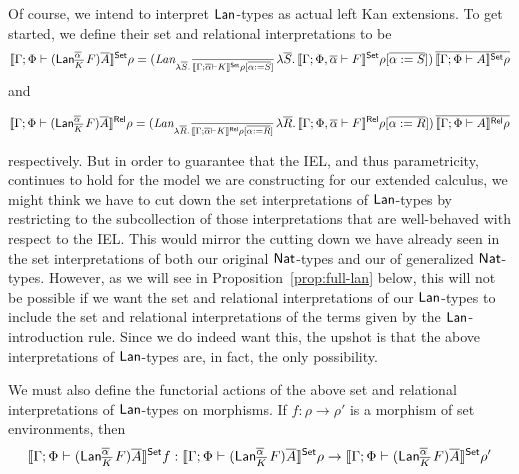 \documentclass{lmcs}
\theoremstyle{plain}\newtheorem{satz}[thm]{Satz}
\begin{document}
Of course, we intend to interpret $\mathsf{Lan}$-types as actual left Kan
extensions. To get started, we define their set and relational
interpretations to be
\[
  \llbracket{\Gamma;\Phi \vdash
    (\mathsf{Lan}^{\overline{\alpha}}_{\overline{K}}\,F)\overline{A}}\rrbracket^{\mathsf{Set}}\rho = (
  \textit{Lan}_{\lambda \overline{S}.\,\overline{\llbracket{\Gamma; \overline{\alpha} \vdash K}\rrbracket^{\mathsf{Set}}
      \rho[\overline{\alpha := S}]}}\, \lambda \overline{S}.\,\llbracket{\Gamma; \Phi, \overline{\alpha}
    \vdash F}\rrbracket^{\mathsf{Set}} \rho[\overline{\alpha := S}])\, \overline{\llbracket{\Gamma; \Phi
      \vdash A}\rrbracket^{\mathsf{Set}}\rho}
\]
and 

\[
  \llbracket{\Gamma;\Phi \vdash
    (\mathsf{Lan}^{\overline{\alpha}}_{\overline{K}}\,F)\overline{A}}\rrbracket^{\mathsf{Rel}}\rho = (
  \textit{Lan}_{\lambda \overline{R}.\,\overline{\llbracket{\Gamma; \overline{\alpha} \vdash
        K}\rrbracket^{\mathsf{Rel}}\rho[\overline{\alpha := R}]}}\, \lambda \overline{R}.\,\llbracket{\Gamma;
    \Phi, \overline{\alpha} \vdash F}\rrbracket^{\mathsf{Rel}}\rho[\overline{\alpha := R}])\,
  \overline{\llbracket{\Gamma; \Phi \vdash A}\rrbracket^{\mathsf{Rel}}\rho}
\]

\vspace*{0.05in}

\noindent
respectively. But in order to guarantee that the IEL, and thus
parametricity, continues to hold for the model we are constructing for
our extended calculus, we might think we have to cut down the set
interpretations of $\mathsf{Lan}$-types by restricting to the subcollection of
those interpretations that are well-behaved with respect to the
IEL. This would mirror the cutting down we have already seen in the
set interpretations of both our original $\mathsf{Nat}$-types and our of
generalized $\mathsf{Nat}$-types. However, as we will see in
Proposition~\ref{prop:full-lan} below, this will not be possible if we
want the set and relational interpretations of our $\mathsf{Lan}$-types to
include the set and relational interpretations of the terms given by
the $\mathsf{Lan}$-introduction rule. Since we do indeed want this, the upshot
is that the above interpretations of $\mathsf{Lan}$-types are, in fact, the
only possibility.

We must also define the functorial actions of the above set and
relational interpretations of $\mathsf{Lan}$-types on morphisms. If $f : \rho
\to \rho'$ is a morphism of set environments, then
\[
\llbracket{\Gamma;\Phi \vdash (\mathsf{Lan}^{\overline{\alpha}}_{\overline{K}}\,F)\overline{A}}\rrbracket^{\mathsf{Set}}f
: \llbracket{\Gamma;\Phi \vdash (\mathsf{Lan}^{\overline{\alpha}}_{\overline{K}}\,F)\overline{A}}\rrbracket^{\mathsf{Set}}\rho
\to \llbracket{\Gamma;\Phi \vdash (\mathsf{Lan}^{\overline{\alpha}}_{\overline{K}}\,F)\overline{A}}\rrbracket^{\mathsf{Set}}\rho'
\]

\vspace*{0.05in}
\end{document}
